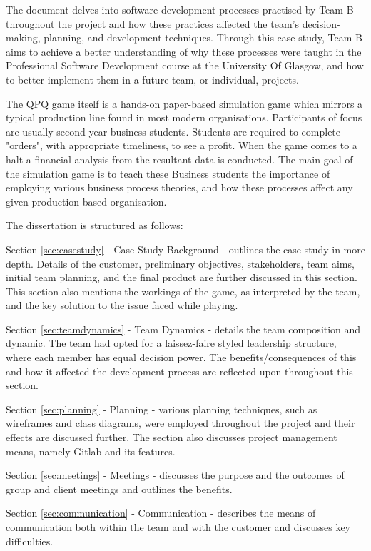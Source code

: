 \documentclass{l3proj}
\begin{document}
The document delves into software development processes practised by Team B throughout the project and how these practices affected the team's decision-making, planning, and development techniques. Through this case study, Team B aims to achieve a better understanding of why these processes were taught in the Professional Software Development course at the University Of Glasgow, and how to better implement them in a future team, or individual, projects.

The QPQ game itself is a hands-on paper-based simulation game which mirrors a typical production line found in most modern organisations. Participants of focus are usually second-year business students. Students are required to complete "orders", with appropriate timeliness, to see a profit. When the game comes to a halt a financial analysis from the resultant data is conducted. The main goal of the simulation game is to teach these Business students the importance of employing various business process theories, and how these processes affect any given production based organisation.  

The dissertation is structured as follows:

Section \ref{sec:casestudy} - Case Study Background - outlines the case study in more depth. Details of the customer, preliminary objectives, stakeholders, team aims, initial team planning, and the final product are further discussed in this section. This section also mentions the workings of the game, as interpreted by the team, and the key solution to the issue faced while playing.

Section \ref{sec:teamdynamics} -  Team Dynamics - details the team composition and dynamic. The team had opted for a laissez-faire styled leadership structure, where each member has equal decision power. The benefits/consequences of this and how it affected the development process are reflected upon throughout this section.

Section \ref{sec:planning} - Planning - various planning techniques, such as wireframes and class diagrams, were employed throughout the project and their effects are discussed further. The section also discusses project management means, namely Gitlab and its features.

Section \ref{sec:meetings} - Meetings - discusses the purpose and the outcomes of group and client meetings and outlines the benefits.

Section \ref{sec:communication} - Communication - describes the means of communication both within the team and with the customer and discusses key difficulties.
\end{document}
